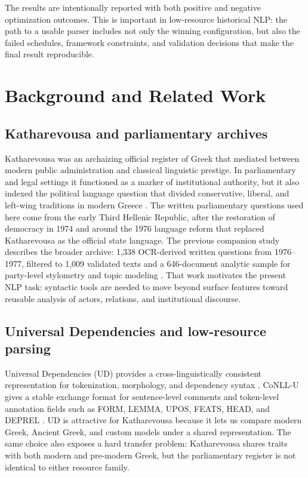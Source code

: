 \documentclass[11pt]{article}
\begin{document}
The results are intentionally reported with both positive and negative optimization outcomes. This is important in low-resource historical NLP: the path to a usable parser includes not only the winning configuration, but also the failed schedules, framework constraints, and validation decisions that make the final result reproducible.

\section{Background and Related Work}

\subsection{Katharevousa and parliamentary archives}

Katharevousa was an archaizing official register of Greek that mediated between modern public administration and classical linguistic prestige. In parliamentary and legal settings it functioned as a marker of institutional authority, but it also indexed the political language question that divided conservative, liberal, and left-wing traditions in modern Greece \cite{mackridge2009}. The written parliamentary questions used here come from the early Third Hellenic Republic, after the restoration of democracy in 1974 and around the 1976 language reform that replaced Katharevousa as the official state language. The previous companion study describes the broader archive: 1{,}338 OCR-derived written questions from 1976--1977, filtered to 1{,}009 validated texts and a 646-document analytic sample for party-level stylometry and topic modeling \cite{mikrosfitsilis2025dsh}. That work motivates the present NLP task: syntactic tools are needed to move beyond surface features toward reusable analysis of actors, relations, and institutional discourse.

\subsection{Universal Dependencies and low-resource parsing}

Universal Dependencies (UD) provides a cross-linguistically consistent representation for tokenization, morphology, and dependency syntax \cite{nivre2020ud}. CoNLL-U gives a stable exchange format for sentence-level comments and token-level annotation fields such as FORM, LEMMA, UPOS, FEATS, HEAD, and DEPREL \cite{udformat}. UD is attractive for Katharevousa because it lets us compare modern Greek, Ancient Greek, and custom models under a shared representation. The same choice also exposes a hard transfer problem: Katharevousa shares traits with both modern and pre-modern Greek, but the parliamentary register is not identical to either resource family.
\end{document}
